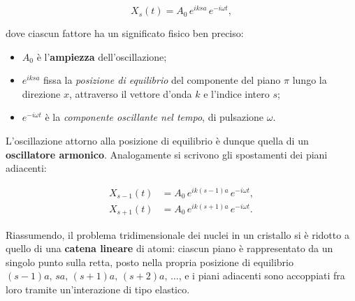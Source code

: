 \begin{equation}
    X_s(t) = A_0 \, e^{i k s a} \, e^{-i \omega t},
\end{equation}

dove ciascun fattore ha un significato fisico ben preciso:

\begin{itemize}
    \item \( A_0 \) è l'\textbf{ampiezza} dell'oscillazione;
    \item \( e^{i k s a} \) fissa la \emph{posizione di equilibrio} del componente del piano \( \pi \) lungo la direzione \( x \), attraverso il vettore d'onda \( k \) e l'indice intero \( s \);
    \item \( e^{-i \omega t} \) è la \emph{componente oscillante nel tempo}, di pulsazione \( \omega \).
\end{itemize}

L'oscillazione attorno alla posizione di equilibrio è dunque quella di un \textbf{oscillatore armonico}. Analogamente si scrivono gli spostamenti dei piani adiacenti:

\begin{align}
    X_{s-1}(t) &= A_0 \, e^{i k (s-1) a} \, e^{-i \omega t}, \\
    X_{s+1}(t) &= A_0 \, e^{i k (s+1) a} \, e^{-i \omega t}.
\end{align}

Riassumendo, il problema tridimensionale dei nuclei in un cristallo si è ridotto a quello di una \textbf{catena lineare} di atomi: ciascun piano è rappresentato da un singolo punto sulla retta, posto nella propria posizione di equilibrio \( (s-1)a, \, sa, \, (s+1)a, \, (s+2)a, \, \ldots \), e i piani adiacenti sono accoppiati fra loro tramite un'interazione di tipo elastico.

